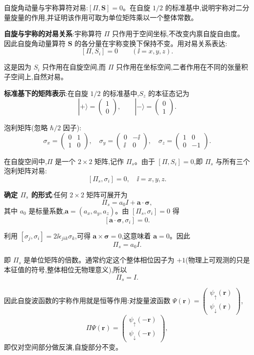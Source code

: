 \begin{question}
自旋角动量与宇称算符对易:$[\Pi,\mathbf S]=0$。在自旋 $1/2$ 的标准基中,说明宇称对二分量旋量的作用,并证明该作用可取为单位矩阵乘以一个整体常数。
\begin{solution}
	\textbf{自旋与宇称的对易关系}:宇称算符 $\Pi$ 只作用于空间坐标,不改变内禀自旋自由度。因此自旋角动量算符 $\mathbf S$ 的各分量在宇称变换下保持不变。用对易关系表达:
	\[
	[\Pi,S_i]=0\qquad (\ii=x,y,z).
	\]

	这是因为 $S_i$ 只作用在自旋空间,而 $\Pi$ 只作用在坐标空间,二者作用在不同的张量积子空间上,自然对易。

	\textbf{标准基下的矩阵表示}:在自旋 $1/2$ 的标准基中,$S_z$ 的本征态记为
	\[
	|+\rangle = \begin{pmatrix}1\\0\end{pmatrix},\qquad |-\rangle = \begin{pmatrix}0\\1\end{pmatrix}.
	\]

	泡利矩阵(忽略 $\hbar/2$ 因子):
	\[
	\sigma_x=\begin{pmatrix}0&1\\1&0\end{pmatrix},\quad
	\sigma_y=\begin{pmatrix}0&-\ii\\\ii&0\end{pmatrix},\quad
	\sigma_z=\begin{pmatrix}1&0\\0&-1\end{pmatrix}.
	\]

	在自旋空间中,$\Pi$ 是一个 $2\times2$ 矩阵,记作 $\Pi_s$。由于 $[\Pi,S_i]=0$,即 $\Pi_s$ 与所有三个泡利矩阵对易:
	\[
	[\Pi_s,\sigma_i]=0,\quad \ii=x,y,z.
	\]

	\textbf{确定 $\Pi_s$ 的形式}:任何 $2\times2$ 矩阵可展开为
	\[
	\Pi_s = a_0 I + \mathbf a\cdot\boldsymbol\sigma,
	\]
	其中 $a_0$ 是标量系数,$\mathbf a=(a_x,a_y,a_z)$。由 $[\Pi_s,\sigma_i]=0$ 得
	\[
	[\mathbf a\cdot\boldsymbol\sigma,\sigma_i]=0.
	\]

	利用 $[\sigma_j,\sigma_i]=2\ii\epsilon_{jik}\sigma_k$,可得 $\mathbf a\times\boldsymbol\sigma=0$,这意味着 $\mathbf a=0$。因此
	\[
	\Pi_s = a_0 I.
	\]

	\noindent 即 $\Pi_s$ 是单位矩阵的倍数。通常约定这个整体相位因子为 $+1$(物理上可观测的只是本征值的符号,整体相位无物理意义),所以
	\[
	\boxed{\Pi_s = I}.
	\]

	因此自旋波函数的宇称作用就是恒等作用:对旋量波函数 $\Psi(\mathbf r)=\begin{pmatrix}\psi_\uparrow(\mathbf r)\\\psi_\downarrow(\mathbf r)\end{pmatrix}$,
	\[
	\Pi\Psi(\mathbf r)=\begin{pmatrix}\psi_\uparrow(-\mathbf r)\\\psi_\downarrow(-\mathbf r)\end{pmatrix},
	\]
	即仅对空间部分做反演,自旋部分不变。
	\end{solution}
\end{question}

